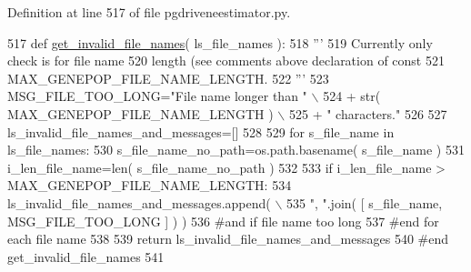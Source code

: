 Definition at line 517 of file pgdriveneestimator.\+py.


\begin{DoxyCode}
517 \textcolor{keyword}{def }\hyperlink{namespacenegui_1_1pgdriveneestimator_a944008262ae2ee7c6fc796499be626ce}{get\_invalid\_file\_names}( ls\_file\_names ):
518     \textcolor{stringliteral}{'''}
519 \textcolor{stringliteral}{    Currently only check is for file name}
520 \textcolor{stringliteral}{    length (see comments above declaration of const }
521 \textcolor{stringliteral}{    MAX\_GENEPOP\_FILE\_NAME\_LENGTH.}
522 \textcolor{stringliteral}{    '''}
523     MSG\_FILE\_TOO\_LONG=\textcolor{stringliteral}{"File name longer than "} \(\backslash\)
524             + str( MAX\_GENEPOP\_FILE\_NAME\_LENGTH ) \(\backslash\)
525             + \textcolor{stringliteral}{" characters."}
526 
527     ls\_invalid\_file\_names\_and\_messages=[]
528 
529     \textcolor{keywordflow}{for} s\_file\_name \textcolor{keywordflow}{in} ls\_file\_names:
530         s\_file\_name\_no\_path=os.path.basename( s\_file\_name )
531         i\_len\_file\_name=len( s\_file\_name\_no\_path )
532 
533         \textcolor{keywordflow}{if} i\_len\_file\_name > MAX\_GENEPOP\_FILE\_NAME\_LENGTH:
534             ls\_invalid\_file\_names\_and\_messages.append( \(\backslash\)
535                     \textcolor{stringliteral}{", "}.join( [ s\_file\_name, MSG\_FILE\_TOO\_LONG ] ) )
536         \textcolor{comment}{#and if file name too long}
537     \textcolor{comment}{#end for each file name}
538 
539     \textcolor{keywordflow}{return} ls\_invalid\_file\_names\_and\_messages
540 \textcolor{comment}{#end get\_invalid\_file\_names}
541 
\end{DoxyCode}
